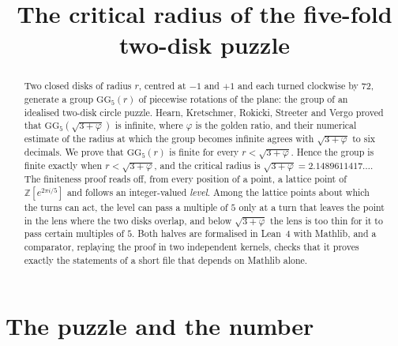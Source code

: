 \documentclass[11pt,a4paper]{article}
\title{\textbf{The critical radius of the five-fold two-disk puzzle}}
\author{\placeholder{Authors}}
\date{\placeholder{Date}}
\newcommand{\Z}{\mathbb{Z}}
\newcommand{\GG}{\mathrm{GG}}
\begin{document}
\maketitle

\begin{abstract}
\noindent
Two closed disks of radius $r$, centred at $-1$ and $+1$ and each turned clockwise by
72\textdegree{}, generate a group $\GG_5(r)$ of piecewise rotations of the plane: the group of an
idealised two-disk circle puzzle. Hearn, Kretschmer, Rokicki, Streeter and Vergo proved that
$\GG_5(\sqrt{3+\varphi})$ is infinite, where $\varphi$ is the golden ratio, and their numerical
estimate of the radius at which the group becomes infinite agrees with $\sqrt{3+\varphi}$ to six
decimals. We prove that $\GG_5(r)$ is finite for every $r<\sqrt{3+\varphi}$. Hence the group is
finite exactly when $r<\sqrt{3+\varphi}$, and the critical radius is
$\sqrt{3+\varphi}=2.1489611417\ldots$. The finiteness proof reads off, from every position of a
point, a lattice point of $\Z[e^{2\pi i/5}]$ and follows an integer-valued \emph{level}. Among the
lattice points about which the turns can act, the level can pass a multiple of $5$ only at a turn
that leaves the point in the lens where the two disks overlap, and below $\sqrt{3+\varphi}$ the lens
is too thin for it to pass certain multiples of $5$. Both halves are formalised in Lean~4 with
Mathlib, and a comparator, replaying the proof in two independent kernels, checks that it proves
exactly the statements of a short file that depends on Mathlib alone.
\end{abstract}

\section{The puzzle and the number}\label{sec:intro}
\end{document}

